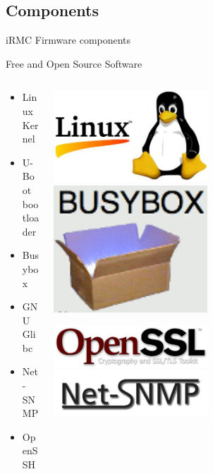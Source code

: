\documentclass{beamer}
\begin{document}
  \subsection{Components}
  \begin{frame}{iRMC Firmware components}

	  \begin{block}{Free and Open Source Software}
		\begin{columns}[onlytextwidth]
			\begin{column}{0.6\textwidth}
			      	\begin{itemize}
					\item Linux Kernel
					\item U-Boot bootloader
					\item Busybox
					\item GNU Glibc
					\item Net-SNMP
					\item OpenSSH
				\end{itemize}
			\end{column}

			\begin{column}{0.3\textwidth}

				\includegraphics[width=0.5\textwidth]{logo/linux.jpg} 			
				\includegraphics[width=0.5\textwidth]{logo/busybox.png}
				
				\includegraphics[width=0.5\textwidth]{logo/openssl.png} 
				\includegraphics[width=0.5\textwidth]{logo/netsnmp.jpg}


\end{column}
\end{columns}
\end{block}
\end{frame}
\end{document}

